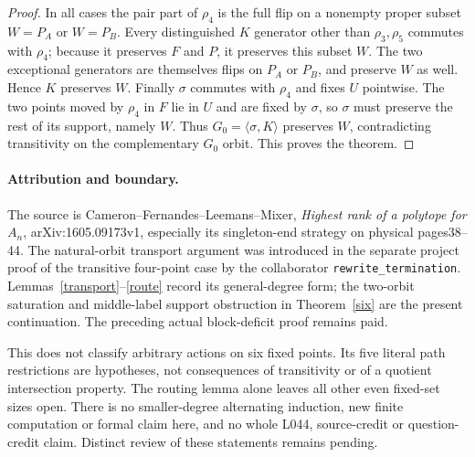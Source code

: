 \documentclass[10pt,a4paper]{article}
\newcommand{\gen}[1]{\langle#1\rangle}
\begin{document}
\begin{proof}
In all cases the pair part of $\rho_4$ is the full flip on a
nonempty proper subset $W=P_A$ or $W=P_B$. Every distinguished
$K$ generator other than $\rho_3,\rho_5$ commutes with $\rho_4$;
because it preserves $F$ and $P$, it preserves this subset $W$.
The two exceptional generators are themselves flips on $P_A$ or
$P_B$, and preserve $W$ as well. Hence $K$ preserves $W$.
Finally $\sigma$ commutes with $\rho_4$ and fixes $U$ pointwise.
The two points moved by $\rho_4$ in $F$ lie in $U$ and are fixed
by $\sigma$, so $\sigma$ must preserve the rest of its support,
namely $W$. Thus $G_0=\gen{\sigma,K}$ preserves $W$, contradicting
transitivity on the complementary $G_0$ orbit. This proves the theorem.
\end{proof}

\paragraph{Attribution and boundary.}
The source is Cameron--Fernandes--Leemans--Mixer,
\emph{Highest rank of a polytope for $A_n$}, arXiv:1605.09173v1,
especially its singleton-end strategy on physical pages38--44.
The natural-orbit transport argument was introduced in the separate
project proof of the transitive four-point case by the collaborator
\texttt{rewrite\_termination}. Lemmas~\ref{transport}--\ref{route}
record its general-degree form; the two-orbit saturation and
middle-label support obstruction in Theorem~\ref{six} are the present
continuation. The preceding actual block-deficit proof remains paid.

This does not classify arbitrary actions on six fixed points.
Its five literal path restrictions are hypotheses, not consequences
of transitivity or of a quotient intersection property. The routing
lemma alone leaves all other even fixed-set sizes open. There is no
smaller-degree alternating induction, new finite computation or formal
claim here, and no whole L044, source-credit or question-credit claim.
Distinct review of these statements remains pending.
\end{document}
